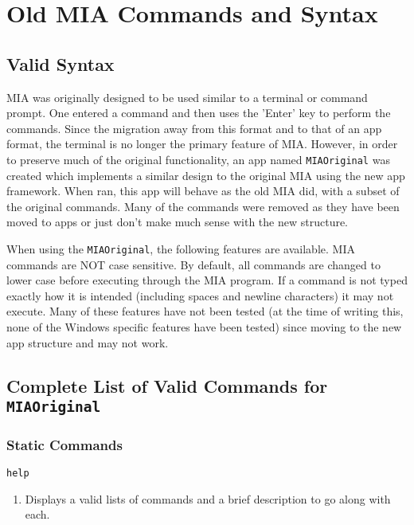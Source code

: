 \chapter{Old MIA Commands and Syntax}
\pagestyle{fancy}

\section{Valid Syntax}
MIA was originally designed to be used similar to a terminal or command prompt. One entered a command and then uses the 'Enter' key to perform the commands. Since the migration away from this format and to that of an app format, the terminal is no longer the primary feature of MIA. However, in order to preserve much of the original functionality, an app named \texttt{MIAOriginal} was created which implements a similar design to the original MIA using the new app framework. When ran, this app will behave as the old MIA did, with a subset of the original commands. Many of the commands were removed as they have been moved to apps or just don't make much sense with the new structure. 

When using the \texttt{MIAOriginal}, the following features are available. MIA commands are NOT case sensitive. By default, all commands are changed to lower case before executing through the MIA program. If a command is not typed exactly how it is intended (including spaces and newline characters) it may not execute. Many of these features have not been tested (at the time of writing this, none of the Windows specific features have been tested) since moving to the new app structure and may not work.


\section{Complete List of Valid Commands for \texttt{MIAOriginal}}

\subsection{Static Commands}

\begin{lstlisting}
help
\end{lstlisting}
\begin{enumerate}
	\item[] Displays a valid lists of commands and a brief description to go along with each.
\end{enumerate}

